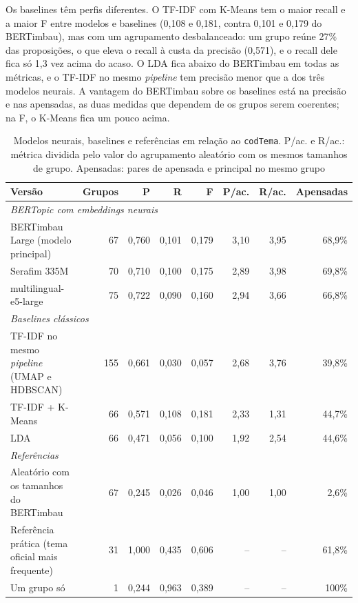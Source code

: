 \documentclass[12pt]{article}
\newcommand{\tabfont}{\fontsize{9}{11}\selectfont\setlength{\tabcolsep}{2.5pt}}
\begin{document}
Os baselines têm perfis diferentes. O TF-IDF com K-Means tem o maior recall e a maior F entre modelos e baselines (0,108 e 0,181, contra 0,101 e 0,179 do BERTimbau), mas com um agrupamento desbalanceado: um grupo reúne 27\% das proposições, o que eleva o recall à custa da precisão (0,571), e o recall dele fica só 1,3 vez acima do acaso. O LDA fica abaixo do BERTimbau em todas as métricas, e o TF-IDF no mesmo \textit{pipeline} tem precisão menor que a dos três modelos neurais. A vantagem do BERTimbau sobre os baselines está na precisão e nas apensadas, as duas medidas que dependem de os grupos serem coerentes; na F, o K-Means fica um pouco acima.

\begin{table}[H]
\centering
\caption{Modelos neurais, baselines e referências em relação ao \texttt{codTema}. P/ac. e R/ac.: métrica dividida pelo valor do agrupamento aleatório com os mesmos tamanhos de grupo. Apensadas: pares de apensada e principal no mesmo grupo}
\label{tab:modelos}
\tabfont
\begin{tabular}{l r r r r r r r}
\toprule
\textbf{Versão} & \textbf{Grupos} & \textbf{P} & \textbf{R} & \textbf{F} & \textbf{P/ac.} & \textbf{R/ac.} & \textbf{Apensadas} \\
\midrule
\multicolumn{8}{l}{\textit{BERTopic com embeddings neurais}} \\
BERTimbau Large (modelo principal) & 67 & 0,760 & 0,101 & 0,179 & 3,10 & 3,95 & 68,9\% \\
Serafim 335M & 70 & 0,710 & 0,100 & 0,175 & 2,89 & 3,98 & 69,8\% \\
multilingual-e5-large & 75 & 0,722 & 0,090 & 0,160 & 2,94 & 3,66 & 66,8\% \\
\midrule
\multicolumn{8}{l}{\textit{Baselines clássicos}} \\
TF-IDF no mesmo \textit{pipeline} (UMAP e HDBSCAN) & 155 & 0,661 & 0,030 & 0,057 & 2,68 & 3,76 & 39,8\% \\
TF-IDF + K-Means & 66 & 0,571 & 0,108 & 0,181 & 2,33 & 1,31 & 44,7\% \\
LDA & 66 & 0,471 & 0,056 & 0,100 & 1,92 & 2,54 & 44,6\% \\
\midrule
\multicolumn{8}{l}{\textit{Referências}} \\
Aleatório com os tamanhos do BERTimbau & 67 & 0,245 & 0,026 & 0,046 & 1,00 & 1,00 & 2,6\% \\
Referência prática (tema oficial mais frequente) & 31 & 1,000 & 0,435 & 0,606 & -- & -- & 61,8\% \\
Um grupo só & 1 & 0,244 & 0,963 & 0,389 & -- & -- & 100\% \\
\bottomrule
\end{tabular}
\end{table}
\end{document}
